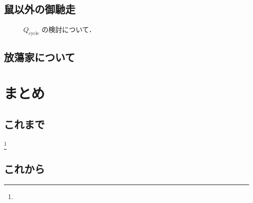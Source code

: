 \documentclass[
  leqno,
  twoside,
  numbers=noenddot,
]{scrbook}
\begin{document}
\section{鼠以外の御馳走}
\begin{figure} %
  \centering
  \myGraph*{} %
  \caption{$Q_{\mathrm{cycle}}$ の検討について．
    \label{fig:4}}
\end{figure}

\section{放蕩家について}

\chapter{まとめ}

\section{これまで}
\footnote{}


\section{これから}
\cite{Wasserman2004,Billingsley1999,HornJohnson1990,Hastie_etal2009}

\backmatter
\begin{otherlanguage}{english}
  \printbibliography[title=参考文献]
\end{otherlanguage}
\end{document}
